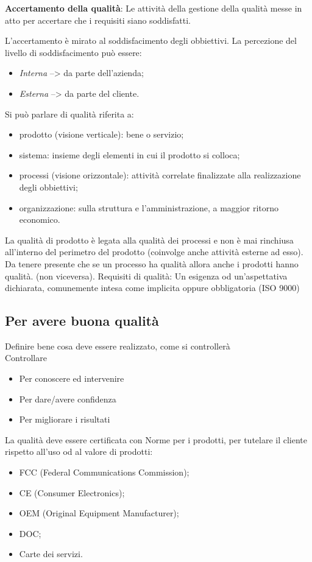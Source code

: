 \textbf{Accertamento della qualità}: Le attività della gestione della qualità messe in atto per accertare
che i requisiti siano soddisfatti.

L'accertamento è mirato al soddisfacimento degli obbiettivi. La percezione del livello di soddisfacimento può essere:
\begin{itemize}
\item \textit{Interna} --> da parte dell'azienda;
\item \textit{Esterna} --> da parte del cliente.
\end{itemize}
Si può parlare di qualità riferita a:
\begin{itemize}
\item prodotto (visione verticale): bene o servizio;
\item sistema: insieme degli elementi in cui il prodotto si colloca;
\item processi (visione orizzontale): attività correlate finalizzate alla realizzazione degli obbiettivi;
\item organizzazione: sulla struttura e l'amministrazione, a maggior ritorno economico.
\end{itemize}
La qualità di prodotto è legata alla qualità dei processi e non è mai rinchiusa all'interno del perimetro del prodotto (coinvolge anche attività esterne ad esso).
Da tenere presente che se un processo ha qualità allora anche i prodotti hanno qualità. (non viceversa).
Requisiti di qualità: Un esigenza od un'aspettativa dichiarata, comunemente intesa come implicita oppure obbligatoria (ISO 9000)

\subsection{Per avere buona qualità}
Definire bene cosa deve essere realizzato, come si controllerà\\
Controllare
\begin{itemize}
\item Per conoscere ed intervenire
\item Per dare/avere confidenza
\item Per migliorare i risultati
\end{itemize}

La qualità deve essere certificata con Norme per i prodotti, per tutelare il cliente rispetto all'uso od al valore di prodotti:
\begin{itemize}
\item FCC (Federal Communications Commission);
\item CE (Consumer Electronics);
\item OEM (Original Equipment Manufacturer);
\item DOC;
\item Carte dei servizi.
\end{itemize}


